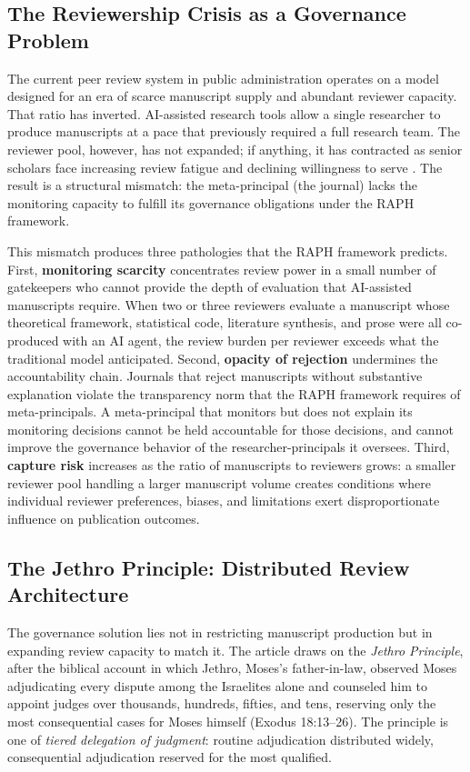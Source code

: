\documentclass[12pt]{article}
\begin{document}
\subsection{The Reviewership Crisis as a Governance Problem}

The current peer review system in public administration operates on a model designed for an
era of scarce manuscript supply and abundant reviewer capacity. That ratio has inverted.
AI-assisted research tools allow a single researcher to produce manuscripts at a pace that
previously required a full research team. The reviewer pool, however, has not expanded; if
anything, it has contracted as senior scholars face increasing review fatigue and declining
willingness to serve \citep{publons2018global}. The result is a structural mismatch: the
meta-principal (the journal) lacks the monitoring capacity to fulfill its governance
obligations under the RAPH framework.

This mismatch produces three pathologies that the RAPH framework predicts. First,
\textbf{monitoring scarcity} concentrates review power in a small number of gatekeepers
who cannot provide the depth of evaluation that AI-assisted manuscripts require. When two
or three reviewers evaluate a manuscript whose theoretical framework, statistical code,
literature synthesis, and prose were all co-produced with an AI agent, the review burden
per reviewer exceeds what the traditional model anticipated. Second, \textbf{opacity of
rejection} undermines the accountability chain. Journals that reject manuscripts without
substantive explanation violate the transparency norm that the RAPH framework requires of
meta-principals. A meta-principal that monitors but does not explain its monitoring decisions
cannot be held accountable for those decisions, and cannot improve the governance behavior
of the researcher-principals it oversees. Third, \textbf{capture risk} increases as the
ratio of manuscripts to reviewers grows: a smaller reviewer pool handling a larger manuscript
volume creates conditions where individual reviewer preferences, biases, and limitations
exert disproportionate influence on publication outcomes.

\subsection{The Jethro Principle: Distributed Review Architecture}

The governance solution lies not in restricting manuscript production but in expanding review
capacity to match it. The article draws on the \emph{Jethro Principle}, after the biblical
account in which Jethro, Moses's father-in-law, observed Moses adjudicating every dispute
among the Israelites alone and counseled him to appoint judges over thousands, hundreds,
fifties, and tens, reserving only the most consequential cases for Moses himself
(Exodus 18:13--26). The principle is one of \emph{tiered delegation of judgment}: routine
adjudication distributed widely, consequential adjudication reserved for the most qualified.
\end{document}

